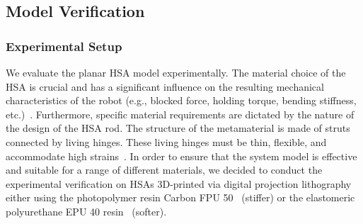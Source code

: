 \subsection{Model Verification}\label{sub:hsamodel:planar_hsa_robot_model:model_verification}

\subsubsection{Experimental Setup}\label{ssub:hsamodel:planar_hsa_robot_model:model_verification:experimental_setup}
We evaluate the planar \gls{HSA} model experimentally.
The material choice of the \gls{HSA} is crucial and has a significant influence on the resulting mechanical characteristics of the robot  (e.g., blocked force, holding torque, bending stiffness, etc.)~\citep{truby2021recipe}. Furthermore, specific material requirements are dictated by the nature of the design of the \gls{HSA} rod. The structure of the metamaterial is made of struts connected by living hinges. These living hinges must be thin, flexible, and accommodate high strains~\citep{truby2021recipe}.
In order to ensure that the system model is effective and suitable for a range of different materials, we decided to conduct the experimental verification on \glspl{HSA} 3D-printed via digital projection lithography either using the photopolymer resin Carbon FPU 50~\citep{carbon:fpu50} (stiffer) or the elastomeric polyurethane EPU 40 resin~\citep{carbon:epu40} (softer).


